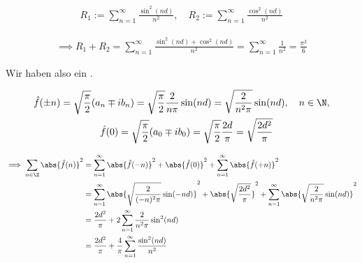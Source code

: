 \begin{solution}
\begin{enumerate}[label = \arabic*.]
    \begin{align*}
        R_1
        :=
        \sum_{n=1}^\infty
        \frac{\sin^2(n d)}{n^2},
        \quad
        R_2
        :=
        \sum_{n=1}^\infty
        \frac{\cos^2(n d)}{n^2}
    \end{align*}
    
    \begin{align*}
        \implies
        R_1 + R_2
        =
        \sum_{n=1}^\infty
        \frac
        {
            \sin^2(n d)
            +
            \cos^2(n d)
        }{n^2}    
        =
        \sum_{n=1}^\infty
        \frac{1}{n^2}
        =
        \frac{\pi^2}{6}
    \end{align*}
    
    Wir haben also ein .

    \begin{gather*}
        \hat f(\pm n)
        =
        \sqrt \frac{\pi}{2}
        (a_n \mp i b_n)
        =
        \sqrt \frac{\pi}{2}
        \frac{2}{n \pi}
        \sin(n d)
        =
        \sqrt \frac{2}{n^2 \pi}
        \sin(n d),
        \quad
        n \in \N, \\
        \quad
        \hat f(0)
        =
        \sqrt \frac{\pi}{2}
        (a_0 \mp i b_0)
        =
        \sqrt \frac{\pi}{2}
        \frac{2 d}{\pi}
        =
        \sqrt \frac{2 d^2}{\pi}
    \end{gather*}

    \begin{align*}
        \implies
        \sum_{n \in \Z}
        \abs{\hat f(n)}^2
        & =
        \sum_{n=1}^\infty
        \abs{\hat f(-n)}^2
        +
        \abs{\hat f(0)}^2
        +
        \sum_{n=1}^\infty
        \abs{\hat f(+n)}^2 \\
        & =
        \sum_{n=1}^\infty
        \abs
        {
            \sqrt \frac{2}{(-n)^2 \pi}
            \sin(-n d)  
        }^2
        +
        \abs
        {
            \sqrt \frac{2 d^2}{\pi}
        }^2
        +
        \sum_{n=1}^\infty
        \abs
        {
            \sqrt \frac{2}{n^2 \pi}
            \sin(n d)   
        }^2 \\
        & =
        \frac{2 d^2}{\pi}
        +
        2 \sum_{n=1}^\infty
        \frac{2}{n^2 \pi}
        \sin^2(n d) \\
        & =
        \frac{2 d^2}{\pi}
        +
        \frac{4}{\pi}
        \sum_{n=1}^\infty
        \frac
        {
            \sin^2(n d)
        }{n^2}
    \end{align*}


\end{enumerate}
\end{solution}
